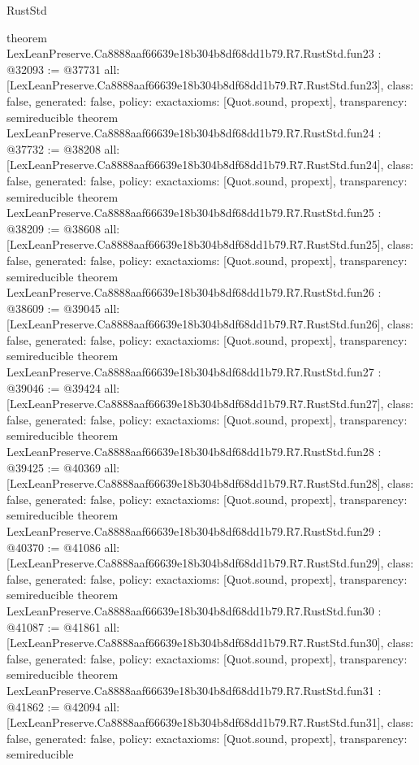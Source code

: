 \begin{lexlean}{RustStd}
\begin{coremodule}
{}
theorem LexLeanPreserve.Ca8888aaf66639e18b304b8df68dd1b79.R7.RustStd.fun23 : @32093 := @37731 {
  all: [LexLeanPreserve.Ca8888aaf66639e18b304b8df68dd1b79.R7.RustStd.fun23],
  class: false,
  generated: false,
  policy: exact{axioms: [Quot.sound, propext]},
  transparency: semireducible
}
theorem LexLeanPreserve.Ca8888aaf66639e18b304b8df68dd1b79.R7.RustStd.fun24 : @37732 := @38208 {
  all: [LexLeanPreserve.Ca8888aaf66639e18b304b8df68dd1b79.R7.RustStd.fun24],
  class: false,
  generated: false,
  policy: exact{axioms: [Quot.sound, propext]},
  transparency: semireducible
}
theorem LexLeanPreserve.Ca8888aaf66639e18b304b8df68dd1b79.R7.RustStd.fun25 : @38209 := @38608 {
  all: [LexLeanPreserve.Ca8888aaf66639e18b304b8df68dd1b79.R7.RustStd.fun25],
  class: false,
  generated: false,
  policy: exact{axioms: [Quot.sound, propext]},
  transparency: semireducible
}
theorem LexLeanPreserve.Ca8888aaf66639e18b304b8df68dd1b79.R7.RustStd.fun26 : @38609 := @39045 {
  all: [LexLeanPreserve.Ca8888aaf66639e18b304b8df68dd1b79.R7.RustStd.fun26],
  class: false,
  generated: false,
  policy: exact{axioms: [Quot.sound, propext]},
  transparency: semireducible
}
theorem LexLeanPreserve.Ca8888aaf66639e18b304b8df68dd1b79.R7.RustStd.fun27 : @39046 := @39424 {
  all: [LexLeanPreserve.Ca8888aaf66639e18b304b8df68dd1b79.R7.RustStd.fun27],
  class: false,
  generated: false,
  policy: exact{axioms: [Quot.sound, propext]},
  transparency: semireducible
}
theorem LexLeanPreserve.Ca8888aaf66639e18b304b8df68dd1b79.R7.RustStd.fun28 : @39425 := @40369 {
  all: [LexLeanPreserve.Ca8888aaf66639e18b304b8df68dd1b79.R7.RustStd.fun28],
  class: false,
  generated: false,
  policy: exact{axioms: [Quot.sound, propext]},
  transparency: semireducible
}
theorem LexLeanPreserve.Ca8888aaf66639e18b304b8df68dd1b79.R7.RustStd.fun29 : @40370 := @41086 {
  all: [LexLeanPreserve.Ca8888aaf66639e18b304b8df68dd1b79.R7.RustStd.fun29],
  class: false,
  generated: false,
  policy: exact{axioms: [Quot.sound, propext]},
  transparency: semireducible
}
theorem LexLeanPreserve.Ca8888aaf66639e18b304b8df68dd1b79.R7.RustStd.fun30 : @41087 := @41861 {
  all: [LexLeanPreserve.Ca8888aaf66639e18b304b8df68dd1b79.R7.RustStd.fun30],
  class: false,
  generated: false,
  policy: exact{axioms: [Quot.sound, propext]},
  transparency: semireducible
}
theorem LexLeanPreserve.Ca8888aaf66639e18b304b8df68dd1b79.R7.RustStd.fun31 : @41862 := @42094 {
  all: [LexLeanPreserve.Ca8888aaf66639e18b304b8df68dd1b79.R7.RustStd.fun31],
  class: false,
  generated: false,
  policy: exact{axioms: [Quot.sound, propext]},
  transparency: semireducible
}
\end{coremodule}
\end{lexlean}
